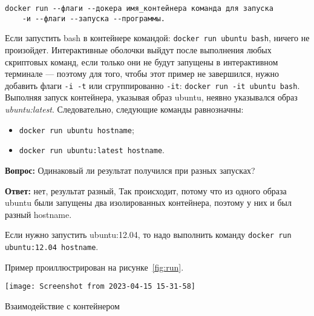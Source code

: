 \begin{verbatim}
docker run --флаги --докера имя_контейнера команда для запуска
	-и --флаги --запуска --программы.
\end{verbatim}

Если запустить bash в контейнере командой: \texttt{docker~run~ubuntu~bash},
ничего не произойдет. Интерактивные оболочки выйдут после
выполнения любых скриптовых команд, если только они не будут
запущены в интерактивном терминале --- поэтому для того, чтобы этот пример
не завершился, нужно добавить флаги \texttt{-i~-t}
или сгруппированно \texttt{-it}: \texttt{docker~run~-it~ubuntu~bash}.
Выполняя запуск контейнера, указывая образ ubuntu,
неявно указывался образ \textit{ubuntu:latest}.
Следовательно, следующие команды равнозначны:

\begin{itemize}
	\item \texttt{docker run ubuntu hostname};
	\item \texttt{docker run ubuntu:latest hostname}.
\end{itemize}

\textbf{Вопрос:} Одинаковый ли результат получился при разных запусках?\par
\textbf{Ответ:} нет, результат разный, Так происходит, потому что из одного
образа ubuntu были запущены два изолированных контейнера, поэтому у
них и был разный hostname.\par
Если нужно запустить ubuntu:12.04, то надо выполнить команду
\texttt{docker run ubuntu:12.04 hostname}.\par
Пример проиллюстрирован на рисунке~\ref{fig:run}.

\begin{image}
	\texttt{[image: Screenshot from 2023-04-15 15-31-58]}
	\caption{Взаимодействие с контейнером}
	\label{fig:run}
\end{image}

